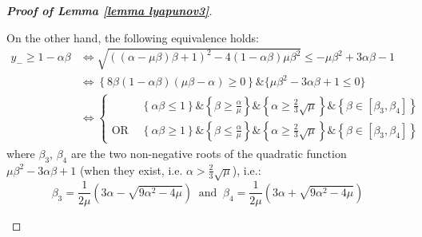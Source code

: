 \documentclass[reqno]{amsart}
\theoremstyle{plain}
\theoremstyle{definition}
\theoremstyle{remark}
\begin{document}
\begin{proof}[\textbf{Proof of Lemma \ref{lemma lyapunov3}}]
\begin{itemize}[wide=0pt]
\begin{itemize}[wide=5pt]
			On the other hand, the following equivalence holds:
			\begin{equation}\label{ymincomp2}
				\begin{aligned}
					y_{-} \geq 1-\alpha\beta &\Leftrightarrow		\sqrt{\left((\alpha-\mu\beta)\beta+1\right)^2 - 4(1-\alpha\beta)\mu\beta^2} \leq -\mu\beta^{2}+3\alpha\beta-1	\\
					& \Leftrightarrow 
					\left\{ 8\beta(1-\alpha\beta)(\mu\beta-\alpha)\geq 0  \right\} \& \{\mu\beta^{2}-3\alpha\beta+1\leq 0\} \\
					& \Leftrightarrow \begin{cases}
						& \left\{\alpha\beta \leq 1\right\}\&\left\{\beta\geq    \frac{\alpha}{\mu}\right\}\&\left\{\alpha\geq  \frac{2}{3}\sqrt{\mu}\right\}\&\left\{\beta\in  [\beta_{3},\beta_{4}]\right\} \\
						\text{OR } &\left\{\alpha\beta \geq 1\right\}\&\left\{\beta\leq \frac{\alpha}{\mu}\right\}\&\left\{\alpha\geq \frac{2}{3}\sqrt{\mu}\right\}\&\left\{\beta\in [\beta_{3},\beta_{4}]\right\} 
					\end{cases}
				\end{aligned}
			\end{equation}
			where $\beta_{3}$, $\beta_{4}$ are the two non-negative roots of the quadratic function $\mu\beta^{2}-3\alpha\beta+1$ (when they exist, i.e. $\alpha>\frac{2}{3}\sqrt{\mu}$), i.e.:
			\begin{equation}\label{beta34proof}
				\beta_{3}=\frac{1}{2\mu}\left(3\alpha-\sqrt{9\alpha^{2}-4\mu}\right) ~ \text{ and } ~ \beta_{4}=\frac{1}{2\mu}\left(3\alpha+\sqrt{9\alpha^{2}-4\mu}\right)
			\end{equation}	
			

\end{itemize}
\end{itemize}
\end{proof}
\end{document}

